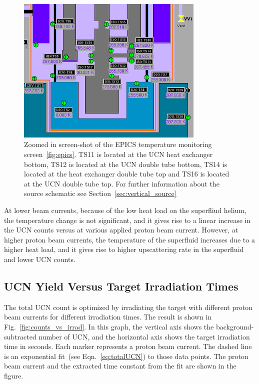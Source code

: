 \begin{figure}[h!]
  \centering
  \includegraphics[width=0.8\textwidth]{TSs.png}
  \caption[TUCAN's EPICS temperature monitoring screen~(zoomed
  in)]{Zoomed in screen-shot of the EPICS temperature monitoring
    screen~\ref{fig:epics}. TS11 is located at the UCN heat exchanger
    bottom, TS12 is located at the UCN double tube bottom, TS14 is
    located at the heat exchanger double tube top and TS16 is located
    at the UCN double tube top. For further information about the
    source schematic see Section~\ref{sec:vertical_source}}
  \label{fig:TSs}
\end{figure}

At lower beam currents, because of the low heat load on the superfliud
helium, the temperature change is not significant, and it gives rise
to a linear increase in the UCN counts versus at various applied
proton beam current. However, at higher proton beam currents, the
temperature of the superfluid increases due to a higher heat load, and
it gives rise to higher upscattering rate in the superfluid and lower
UCN counts.


\subsection{UCN Yield Versus Target Irradiation Times}
The total UCN count is optimized by irradiating the target with
different proton beam currents for different irradiation times. The
result is shown in Fig.~\ref{fig:counts_vs_irrad}. In this graph, the
vertical axis shows the background-subtracted number of UCN, and the
horizontal axis shows the target irradiation time in seconds. Each
marker represents a proton beam current. The dashed line is an
exponential fit~(see Eqn.~\ref{eq:totalUCN}) to those data points. The
proton beam current and the extracted time constant from the fit are
shown in the figure.

